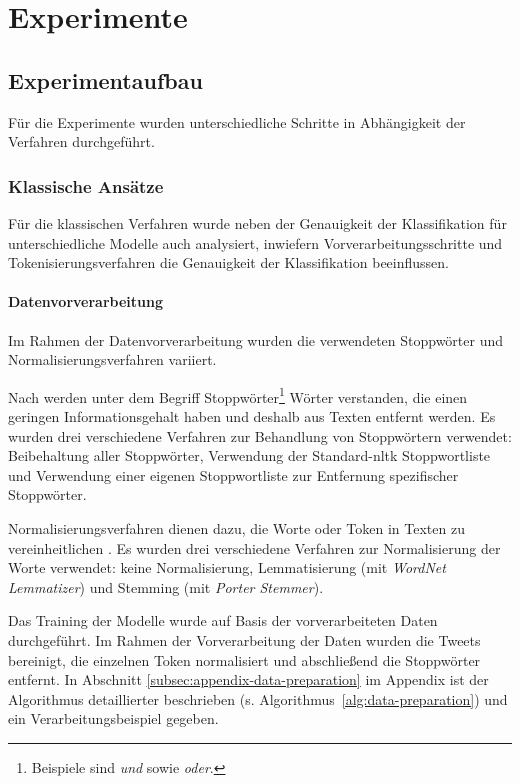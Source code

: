 \section{Experimente}

\subsection{Experimentaufbau}

Für die Experimente wurden unterschiedliche Schritte in Abhängigkeit der Verfahren durchgeführt.

\subsubsection{Klassische Ansätze}\label{sec:klassische-ansaetze}

Für die klassischen Verfahren wurde neben der Genauigkeit der Klassifikation für unterschiedliche Modelle auch analysiert, inwiefern Vorverarbeitungsschritte und Tokeni\-sie\-rungs\-verfahren die Genauigkeit der Klassifikation beeinflussen.

\paragraph{Datenvorverarbeitung}
Im Rahmen der Datenvorverarbeitung wurden die verwendeten Stoppwörter und Normalisierungsverfahren variiert.

Nach \cite[S.27]{manning2009introduction} werden unter dem Begriff Stoppwörter\footnote{Beispiele sind \textit{und} sowie \textit{oder}.} Wörter verstanden, die einen geringen Informationsgehalt haben und deshalb aus Texten entfernt werden.
Es wurden drei verschiedene Verfahren zur Behandlung von Stoppwörtern verwendet: Beibehaltung aller Stoppwörter, Verwendung der Standard-\gls{nltk} Stoppwortliste und Verwendung einer eigenen Stoppwortliste zur Entfernung spezifischer Stoppwörter.

Normalisierungsverfahren dienen dazu, die Worte oder Token in Texten zu vereinheitlichen \cite[S.28]{manning2009introduction}.
Es wurden drei verschiedene Verfahren zur Normalisierung der Worte verwendet: keine Normalisierung, Lemmatisierung (mit \textit{WordNet Lemmatizer}) und Stemming (mit \textit{Porter Stemmer}).

Das Training der Modelle wurde auf Basis der vorverarbeiteten Daten durchgeführt.
Im Rahmen der Vorverarbeitung der Daten wurden die Tweets bereinigt, die einzelnen Token normalisiert und abschließend die Stoppwörter entfernt.
In Abschnitt \ref{subsec:appendix-data-preparation} im Appendix ist der Algorithmus detaillierter beschrieben (s. Algorithmus~\ref{alg:data-preparation}) und ein Verarbeitungsbeispiel gegeben.

